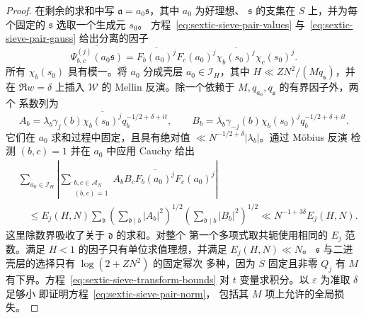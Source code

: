 \begin{proof}
在剩余的求和中写 $\mathfrak a=a_0\mathfrak s$，其中 $a_0$ 为好理想、
$\mathfrak s$ 的支集在 $S$ 上，并为每个固定的 $\mathfrak s$ 选取一个生成元 $s_0$。
方程~\eqref{eq:sextic-sieve-pair-values}
与~\eqref{eq:sextic-sieve-pair-gauss} 给出分离的因子
\[
 \overline{\Psi_{b,c}^{(j)}(a_0\mathfrak s)}
 =\overline{F_b(a_0)^j}F_c(a_0)^j
       \overline{\chi_b(s_0)^j}\chi_c(s_0)^j.
\]
所有 $\chi_b(s_0)$ 具有模一。将 $a_0$ 分成壳层
$a_0\in\mathcal I_H$，其中 $H\ll ZN^2/(Mq_{\mathfrak s})$，并
在 $\Re w=\delta$ 上插入 $\mathscr W$ 的
Mellin 反演。除一个依赖于
$M,q_{a_0},q_{\mathfrak s}$ 的有界因子外，两个
系数列为
\[
 A_b=\lambda_b\gamma_j(b)\overline{\chi_b(s_0)^j}
                    q_b^{-1/2+\delta+it},\qquad
 B_b=\overline{\lambda_b}\gamma_{-j}(b)\chi_b(s_0)^j
                    q_b^{-1/2+\delta+it}.
\]
它们在 $a_0$ 求和过程中固定，且具有绝对值
$\ll N^{-1/2+\delta}|\lambda_b|$。通过 M\"obius 反演
检测 $(b,c)=1$ 并在 $a_0$ 中应用 Cauchy 给出
\begin{align*}
 &\sum_{a_0\in\mathcal I_H}
  \left|\sum_{\substack{b,c\in\mathcal A_N\\(b,c)=1}}
       A_bB_c\overline{F_b(a_0)^j}F_c(a_0)^j\right|\\
 &\quad\le E_j(H,N)\sum_{\mathfrak d}
   \left(\sum_{\mathfrak d\mid b}|A_b|^2\right)^{1/2}
   \left(\sum_{\mathfrak d\mid b}|B_b|^2\right)^{1/2}
 \ll N^{-1+3\delta}E_j(H,N).
\end{align*}
这里除数界吸收了关于 $\mathfrak d$ 的求和。对整个
第一个多项式取共轭使用相同的 $E_j$ 范数。满足
$H<1$ 的因子只有单位求值理想，并满足 $E_j(H,N)\ll N$。
$\mathfrak s$ 与二进壳层的选择只有 $\log(2+ZN^2)$ 的固定幂次
多种，因为 $S$ 固定且非零
$Q_j$ 有 $M$ 有下界。方程~\eqref{eq:sextic-sieve-transform-bounds}
对 $t$ 变量求积分。以 $\varepsilon$ 为准取 $\delta$ 足够小
即证明方程~\eqref{eq:sextic-sieve-pair-norm}，
包括其 $M$ 项上允许的全局损失。


\end{proof}
